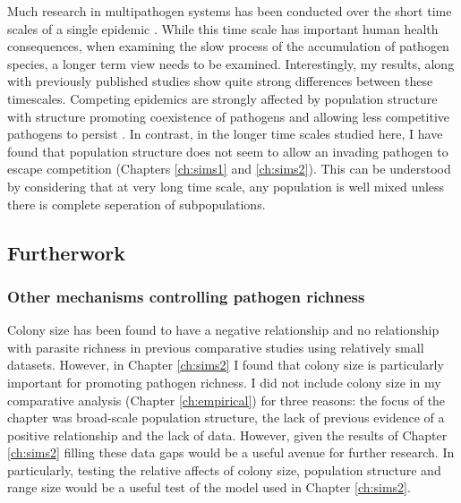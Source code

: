 Much research in multipathogen systems has been conducted over the short time scales of a single epidemic \cite{van2014domination, poletto2013host, poletto2015characterising, funk2010interacting}.
While this time scale has important human health consequences, when examining the slow process of the accumulation of pathogen species, a longer term view needs to be examined.
Interestingly, my results, along with previously published studies show quite strong differences between these timescales. 
Competing epidemics are strongly affected by population structure with structure promoting coexistence of pathogens and allowing less competitive pathogens to persist \cite{poletto2013host, poletto2015characterising}.
In contrast, in the longer time scales studied here, I have found that population structure does not seem to allow an invading pathogen to escape competition (Chapters \ref{ch:sims1} and \ref{ch:sims2}).
This can be understood by considering that at very long time scale, any population is well mixed unless there is complete seperation of subpopulations.



\subsection{Furtherwork}

\subsubsection{Other mechanisms controlling pathogen richness}

Colony size has been found to have a negative relationship \cite{gay2014parasite} and no relationship \cite{turmelle2009correlates} with parasite richness in previous comparative studies using relatively small datasets.
However, in Chapter \ref{ch:sims2} I found that colony size is particularly important for promoting pathogen richness.
I did not include colony size in my comparative analysis (Chapter \ref{ch:empirical}) for three reasons: the focus of the chapter was broad-scale population structure, the lack of previous evidence of a positive relationship \cite{gay2014parasite, turmelle2009correlates} and the lack of data.
However, given the results of Chapter \ref{ch:sims2} filling these data gaps would be a useful avenue for further research.
In particularly, testing the relative affects of colony size, population structure and range size would be a useful test of the model used in Chapter \ref{ch:sims2}.

